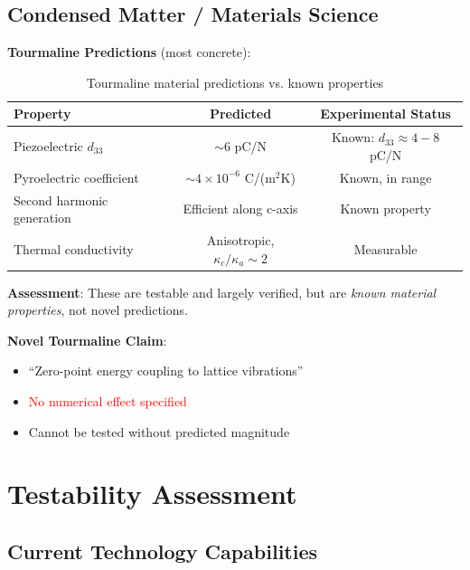 \subsection{Condensed Matter / Materials Science}

\textbf{Tourmaline Predictions} (most concrete):

\begin{table}[H]
\centering
\begin{tabular}{lcc}
\toprule
\textbf{Property} & \textbf{Predicted} & \textbf{Experimental Status} \\
\midrule
Piezoelectric $d_{33}$ & $\sim 6$ pC/N & Known: $d_{33} \approx 4-8$ pC/N \\
Pyroelectric coefficient & $\sim 4 \times 10^{-6}$ C/(m$^2$K) & Known, in range \\
Second harmonic generation & Efficient along c-axis & Known property \\
Thermal conductivity & Anisotropic, $\kappa_c/\kappa_a \sim 2$ & Measurable \\
\bottomrule
\end{tabular}
\caption{Tourmaline material predictions vs. known properties}
\end{table}

\textbf{Assessment}: These are \textcolor{validcolor}{testable and largely verified}, but are \textit{known material properties}, not novel predictions.

\textbf{Novel Tourmaline Claim}:
\begin{itemize}
    \item ``Zero-point energy coupling to lattice vibrations''
    \item \textcolor{red}{No numerical effect specified}
    \item Cannot be tested without predicted magnitude
\end{itemize}

\section{Testability Assessment}

\subsection{Current Technology Capabilities}

